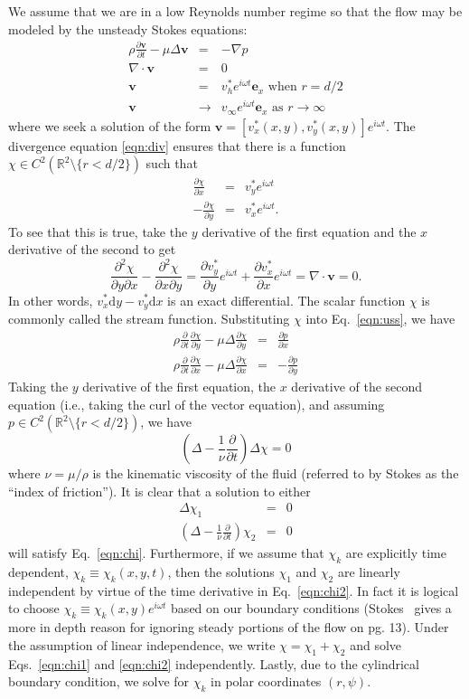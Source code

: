 \documentclass[11pt]{amsart}
\newcommand{\vinf}{v_{\infty}}
\newcommand{\om}{\omega}
\newcommand{\ex}{\mathbf{e}_x}
\newcommand{\bv}{\mathbf{v}}
\newcommand{\bee}[1]{\begin{equation} #1 \end{equation}}
\newcommand{\baa}[1]{\begin{eqnarray} #1 \end{eqnarray}}
\newcommand{\bees}[1]{\begin{equation*} #1 \end{equation*}}
\newcommand{\baas}[1]{\begin{eqnarray*} #1 \end{eqnarray*}}
\newcommand{\pd}[2]{\ensuremath{\frac{\partial #1}{\partial #2}}}
\newcommand{\pddd}[3]{\ensuremath{\frac{\partial^2 #1}{\partial #2 \partial #3}}}
\begin{document}
	We assume that we are in a low Reynolds number regime so that the flow may be modeled by the unsteady Stokes equations:
	\baa{
	\rho\frac{\partial\bv}{\partial t} - \mu\Delta\bv &=& -\nabla p \label{eqn:uss} \\
	\nabla \cdot \bv &=& 0 \label{eqn:div} \\
	\bv &=& v_h^* e^{i\om t}\ex \text{ when } r = d/2 \label{eqn:ussBC1} \\
	\bv &\to& \vinf e^{i\om t}\ex \text{ as } r \to \infty \label{eqn:ussBC2} 
	}
where we seek a solution of the form $\bv = [v_x^*(x,y),v_y^*(x,y)]e^{i\om t}$. The divergence equation \eqref{eqn:div} ensures that there is a function $\chi \in C^2(\mathbb{R}^2\setminus\{r<d/2\})$ such that 
\baa{\pd{\chi}{x} &=& v_y^*e^{i\om t}\nonumber \\
-\pd{\chi}{y} &=& v_x^*e^{i\om t}. \label{eqn:differential}
}
 To see that this is true, take the $y$ derivative of the first equation and the $x$ derivative of the second to get
\bees{
	\pddd{\chi}{y}{x} - \pddd{\chi}{x}{y} = \pd{v_y^*}{y}e^{i\om t} + \pd{v_x^*}{x}e^{i\om t} = \nabla \cdot \bv = 0.
}
In other words, $v_x^*\text{d}y - v_y^*\text{d}x$ is an exact differential. The scalar function $\chi$ is commonly called the stream function. Substituting $\chi$ into Eq.~\eqref{eqn:uss}, we have
\baas{
\rho\pd{}{t}\pd{\chi}{y} - \mu\Delta \pd{\chi}{y} &=& \pd{p}{x} \\
\rho\pd{}{t}\pd{\chi}{x} - \mu\Delta \pd{\chi}{x} &=& -\pd{p}{y} 
}
Taking the $y$ derivative of the first equation, the $x$ derivative of the second equation (i.e., taking the curl of the vector equation), and assuming $p \in C^2(\mathbb{R}^2\setminus\{r<d/2\})$, we have
\bee{
\left(\Delta - \frac{1}{\nu} \pd{}{t} \right)\Delta\chi = 0 \label{eqn:chi}
}
where $\nu = \mu/\rho$ is the kinematic viscosity of the fluid (referred to by Stokes as the ``index of friction''). It is clear that a solution to either
\baa{
\Delta\chi_1 &=& 0 \label{eqn:chi1}\\
\left(\Delta - \frac{1}{\nu} \pd{}{t} \right)\chi_2 &=& 0 \label{eqn:chi2}
}
will satisfy Eq.~\eqref{eqn:chi}. Furthermore, if we assume that $\chi_k$ are explicitly time dependent, $\chi_k \equiv \chi_k(x,y,t)$, then the solutions $\chi_1$ and $\chi_2$ are linearly independent by virtue of the time derivative in Eq.~\eqref{eqn:chi2}. In fact it is logical to choose $\chi_k \equiv \chi_k(x,y)e^{i\om t}$ based on our boundary conditions (Stokes~\cite{stokes} gives a more in depth reason for ignoring steady portions of the flow on pg. 13). Under the assumption of linear independence, we write $\chi = \chi_1 + \chi_2$ and solve Eqs.~\eqref{eqn:chi1} and \eqref{eqn:chi2} independently. Lastly, due to the cylindrical boundary condition, we solve for $\chi_k$ in polar coordinates $(r,\psi)$.
\end{document}
